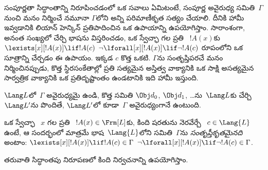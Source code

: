 \documentclass[../../../include/open-logic-section]{subfiles}
\begin{document}


\begin{explain}
సంపూర్ణతా సిద్ధాంతాన్ని నిరూపించడంలో ఒక సవాలు ఏమిటంటే, సంపూర్ణ
అవైరుధ్య సమితి~$\Gamma$ నుంచి మనం నిర్మించే నమూనా $\Gamma$లోని అన్ని
పరిమాణీకృత  సత్యం చేయాలి. దీనికి హామీ ఇవ్వడానికి లియాన్
హెన్కిన్ ప్రతిపాదించిన ఒక ఉపాయాన్ని ఉపయోగిస్తాం. సారాంశంగా, అనంత
సంఖ్యలో  చేర్చి భాషను విస్తరించడం, ఒక స్వేచ్ఛా
 గల ప్రతి ~$!A(x)$కు
      {$\lexists[x][!A(x)] \lif !A(c)$}
      {$\lnot\lforall[x][!A(x)] \lif \lnot !A(c)$}
రూపంలోని ఒక సూత్రాన్ని చేర్చడం ఈ ఉపాయం. ఇక్కడ $c$ కొత్త
 ఒకటి. $\Gamma$ను సంతృప్తిపరచే  మనం
నిర్మించినప్పుడు, కొత్త స్థిరసంకేతాల్లో ప్రతి
{సత్యమైన అస్తిత్వ వాక్యానికి ఒక సాక్షి}
{అసత్యమైన సార్వత్రిక వాక్యానికి ఒక ప్రతిదృష్టాంతం}
ఉండటానికి ఇది హామీ ఇస్తుంది.
\end{explain}

\begin{prop}
$\Lang L$లో~$\Gamma$ అవైరుధ్యమై ఉండి, కొత్త 
 సమితి $\Obj d_0$, $\Obj d_1$, \dots ను~$\Lang L$కు
చేర్చి $\Lang L'$ను పొందితే, $\Lang L'$లో కూడా~$\Gamma$
అవైరుధ్యంగానే ఉంటుంది.
\end{prop}

\begin{defn}[సంతృప్తీకృత సమితి]
ఒక స్వేచ్ఛా ~$x$ గల ప్రతి ~$!A(x) \in
\Frm[L]$కు, కింది షరతును నెరవేర్చే ~$c \in \Lang{L}$
ఉంటే, ఆ సందర్భంలో మాత్రమే భాష~$\Lang {L}$లోని  సమితి~$\Gamma$ను
\emph{సంతృప్తీకృతమైనది} అంటాం:
      {$\lexists[x][!A(x)] \lif !A(c) \in \Gamma$}
      {$\lnot\lforall[x][!A(x)] \lif \lnot !A(c) \in \Gamma$}.
\end{defn}

తరువాతి సిద్ధాంతపు నిరూపణలో కింది నిర్వచనాన్ని ఉపయోగిస్తాం.
\end{document}
